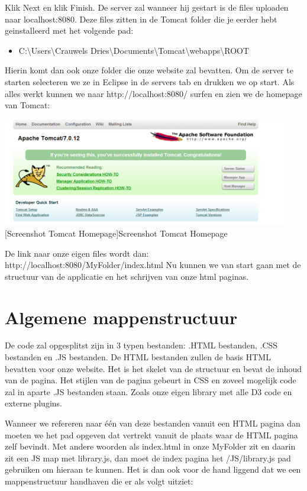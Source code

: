 Klik Next en klik Finish. De server zal wanneer hij gestart is de files uploaden naar localhost:8080. Deze files zitten in de Tomcat folder die je eerder hebt geinstalleerd met het volgende pad:
\begin{itemize}
\item C:\textbackslash Users\textbackslash Crauwels Dries\textbackslash Documents\textbackslash Tomcat\textbackslash webapps\textbackslash ROOT
\end{itemize}
Hierin komt dan ook onze folder die onze website zal bevatten.
Om de server te starten selecteren we ze in Eclipse in de servers tab en drukken we op start.
Als alles werkt kunnen we naar http://localhost:8080/ surfen en zien we de homepage van Tomcat:
\begin{center}
  \includegraphics[width=0.95\textwidth]{figures/chap2/tomcathomepage.png}
  [Screenshot Tomcat Homepage]{Screenshot Tomcat Homepage
  \label{fig_tomcat1}}
\end{center}

De link naar onze eigen files wordt dan: http://localhost:8080/MyFolder/index.html \newline
Nu kunnen we van start gaan met de structuur van de applicatie en het schrijven van onze html paginas.

\section{Algemene mappenstructuur}

De code zal opgesplitst zijn in 3 typen bestanden: .HTML bestanden, .CSS bestanden en .JS bestanden. De HTML bestanden zullen de basis HTML bevatten voor onze website. Het is het skelet van de structuur en bevat de inhoud van de pagina. Het stijlen van de pagina gebeurt in CSS en zoveel mogelijk code zal in aparte .JS bestanden staan. Zoals onze eigen library met alle D3 code en externe plugins.

Wanneer we refereren naar \'{e}\'{e}n van deze bestanden vanuit een HTML pagina dan moeten we het pad opgeven dat vertrekt vanuit de plaats waar de HTML pagina zelf bevindt. Met andere woorden als index.html in onze MyFolder zit en daarin zit een JS map met library.js, dan moet de index pagina het /JS/library.js pad gebruiken om hieraan te kunnen. Het is dan ook voor de hand liggend dat we een mappenstructuur handhaven die er als volgt uitziet:

